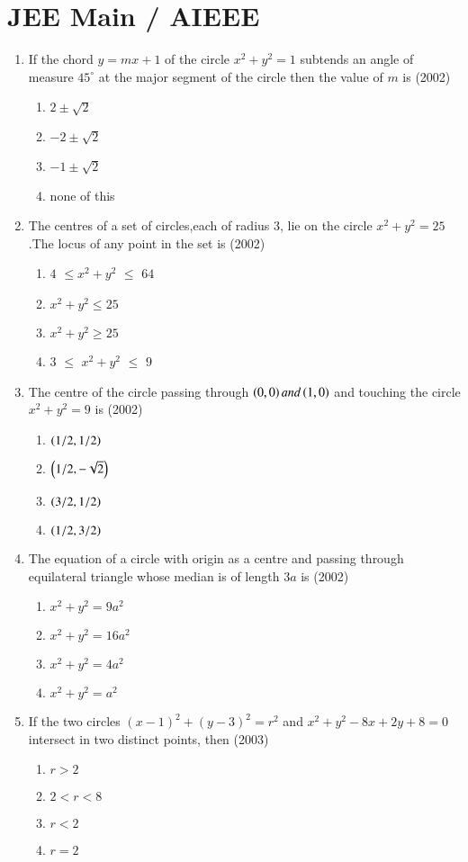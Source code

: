 \documentclass[journal]{IEEEtran}
\numberwithin{equation}{enumi}
\numberwithin{figure}{enumi}
\begin{document}
\section{JEE Main / AIEEE}
\begin{enumerate} 
\item If the chord $y=mx+1$ of the circle $x^2+y^2=1$ subtends an angle of measure \( 45^\circ \) at the major segment of the circle then the value of $m$ is \hfill(2002)
\begin{enumerate}
\item$2\pm\sqrt{2}$
\item$-2\pm\sqrt{2}$
\item$-1\pm\sqrt{2}$
\item none of this
\end{enumerate}
\item The centres of a set of circles,each of radius $3$, lie on the circle $x^2+y^2=25$.The locus of any point in the set is \hfill(2002)
\begin{enumerate}
\item$4$ $\leq$$x^2+y^2$ $\leq$ $64$
\item$x^2+y^2\leq25$
\item$x^2+y^2\geq25$
\item$3$ $\leq$ $x^2+y^2$ $\leq$ $9$
\end{enumerate}
\item The centre of the circle passing through $\left(0,0\right) and \left(1,0\right)$ and touching the circle $x^2+y^2=9$ is \hfill(2002)
\begin{enumerate}
\item$\left(1/2,1/2\right)$
\item$\left(1/2,-\sqrt{2}\right)$
\item$\left(3/2,1/2\right)$
\item$\left(1/2,3/2\right)$
\end{enumerate}
\item The equation of a circle with origin as a centre and passing through equilateral triangle whose median is of length $3a$ is \hfill(2002)
\begin{enumerate}
\item$x^2+y^2=9a^2$
\item$x^2+y^2=16a^2$
\item$x^2+y^2=4a^2$
\item$x^2+y^2=a^2$
\end{enumerate}
\item If the two circles $(x-1)^2+(y-3)^2=r^2$ and $x^2+y^2-8x+2y+8=0$ intersect in two distinct points, then \hfill(2003)
\begin{enumerate}
\item$r>2$
\item$2<r<8$
\item$r<2$
\item$r=2$
\end{enumerate}
\end{enumerate}
\end{document}
